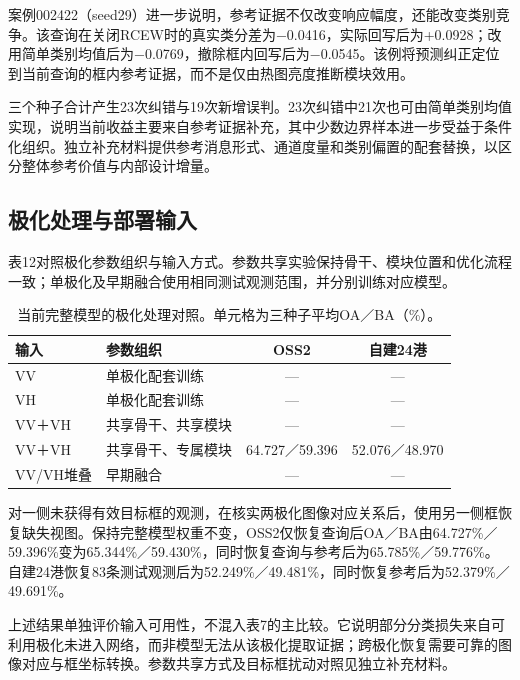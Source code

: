 \documentclass[journal,10pt,a4paper]{IEEEtran}
\begin{document}
案例002422（seed29）进一步说明，参考证据不仅改变响应幅度，还能改变类别竞争。该查询在关闭RCEW时的真实类分差为−0.0416，实际回写后为+0.0928；改用简单类别均值后为−0.0769，撤除框内回写后为−0.0545。该例将预测纠正定位到当前查询的框内参考证据，而不是仅由热图亮度推断模块效用。

三个种子合计产生23次纠错与19次新增误判。23次纠错中21次也可由简单类别均值实现，说明当前收益主要来自参考证据补充，其中少数边界样本进一步受益于条件化组织。独立补充材料提供参考消息形式、通道度量和类别偏置的配套替换，以区分整体参考价值与内部设计增量。

\subsection{极化处理与部署输入}\label{ux6781ux5316ux5904ux7406ux4e0eux90e8ux7f72ux8f93ux5165}

表12对照极化参数组织与输入方式。参数共享实验保持骨干、模块位置和优化流程一致；单极化及早期融合使用相同测试观测范围，并分别训练对应模型。

\begin{table}[H]
\centering\footnotesize
\setcounter{table}{11}
\caption{当前完整模型的极化处理对照。单元格为三种子平均OA／BA（\%）。}
\label{tab:12}
\setlength{\tabcolsep}{3pt}\renewcommand{\arraystretch}{1.2}
\begin{tabularx}{\linewidth}{LLCC}
\toprule
输入 & 参数组织 & OSS2 & 自建24港 \\
\midrule
VV & 单极化配套训练 & --- & --- \\
VH & 单极化配套训练 & --- & --- \\
VV＋VH & 共享骨干、共享模块 & --- & --- \\
VV＋VH & 共享骨干、专属模块 & 64.727／59.396 & 52.076／48.970 \\
VV/VH堆叠 & 早期融合 & --- & --- \\
\bottomrule
\end{tabularx}
\end{table}

对一侧未获得有效目标框的观测，在核实两极化图像对应关系后，使用另一侧框恢复缺失视图。保持完整模型权重不变，OSS2仅恢复查询后OA／BA由64.727\%／59.396\%变为65.344\%／59.430\%，同时恢复查询与参考后为65.785\%／59.776\%。自建24港恢复83条测试观测后为52.249\%／49.481\%，同时恢复参考后为52.379\%／49.691\%。

上述结果单独评价输入可用性，不混入表7的主比较。它说明部分分类损失来自可利用极化未进入网络，而非模型无法从该极化提取证据；跨极化恢复需要可靠的图像对应与框坐标转换。参数共享方式及目标框扰动对照见独立补充材料。
\end{document}
